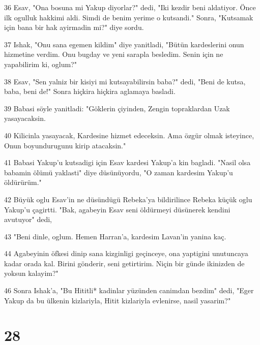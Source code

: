 \par 36 Esav, "Ona bosuna mi Yakup diyorlar?" dedi, "Iki kezdir beni aldatiyor. Önce ilk ogulluk hakkimi aldi. Simdi de benim yerime o kutsandi." Sonra, "Kutsamak için bana bir hak ayirmadin mi?" diye sordu.
\par 37 Ishak, "Onu sana egemen kildim" diye yanitladi, "Bütün kardeslerini onun hizmetine verdim. Onu bugday ve yeni sarapla besledim. Senin için ne yapabilirim ki, oglum?"
\par 38 Esav, "Sen yalniz bir kisiyi mi kutsayabilirsin baba?" dedi, "Beni de kutsa, baba, beni de!" Sonra hiçkira hiçkira aglamaya basladi.
\par 39 Babasi söyle yanitladi: "Göklerin çiyinden, Zengin topraklardan Uzak yasayacaksin.
\par 40 Kilicinla yasayacak, Kardesine hizmet edeceksin. Ama özgür olmak isteyince, Onun boyundurugunu kirip atacaksin."
\par 41 Babasi Yakup'u kutsadigi için Esav kardesi Yakup'a kin bagladi. "Nasil olsa babamin ölümü yaklasti" diye düsünüyordu, "O zaman kardesim Yakup'u öldürürüm."
\par 42 Büyük oglu Esav'in ne düsündügü Rebeka'ya bildirilince Rebeka küçük oglu Yakup'u çagirtti. "Bak, agabeyin Esav seni öldürmeyi düsünerek kendini avutuyor" dedi,
\par 43 "Beni dinle, oglum. Hemen Harran'a, kardesim Lavan'in yanina kaç.
\par 44 Agabeyinin öfkesi dinip sana kizginligi geçinceye, ona yaptigini unutuncaya kadar orada kal. Birini gönderir, seni getirtirim. Niçin bir günde ikinizden de yoksun kalayim?"
\par 46 Sonra Ishak'a, "Bu Hititli* kadinlar yüzünden canimdan bezdim" dedi, "Eger Yakup da bu ülkenin kizlariyla, Hitit kizlariyla evlenirse, nasil yasarim?"

\chapter{28}

